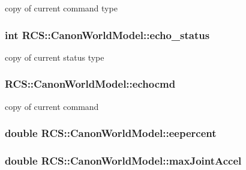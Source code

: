 copy of current command type \hypertarget{structRCS_1_1CanonWorldModel_a31810c18d1846d6c86d84b01831a2408}{
\subsubsection[{echo\-\_\-status}]{\setlength{\rightskip}{0pt plus 5cm}int R\-C\-S\-::\-Canon\-World\-Model\-::echo\-\_\-status}}\label{structRCS_1_1CanonWorldModel_a31810c18d1846d6c86d84b01831a2408}
copy of current status type \hypertarget{structRCS_1_1CanonWorldModel_ac7e75df0508ec626b834a77ebfe0465f}{
\subsubsection[{echocmd}]{ R\-C\-S\-::\-Canon\-World\-Model\-::echocmd}}\label{structRCS_1_1CanonWorldModel_ac7e75df0508ec626b834a77ebfe0465f}
copy of current command \hypertarget{structRCS_1_1CanonWorldModel_ad74c7f3831a2b2cef7854fd294209412}{
\subsubsection[{eepercent}]{\setlength{\rightskip}{0pt plus 5cm}double R\-C\-S\-::\-Canon\-World\-Model\-::eepercent}}\label{structRCS_1_1CanonWorldModel_ad74c7f3831a2b2cef7854fd294209412}
\hypertarget{structRCS_1_1CanonWorldModel_ac20eae577122dd6dc58f92f33c1de53c}{
\subsubsection[{max\-Joint\-Accel}]{\setlength{\rightskip}{0pt plus 5cm}double R\-C\-S\-::\-Canon\-World\-Model\-::max\-Joint\-Accel}}\label{structRCS_1_1CanonWorldModel_ac20eae577122dd6dc58f92f33c1de53c}
